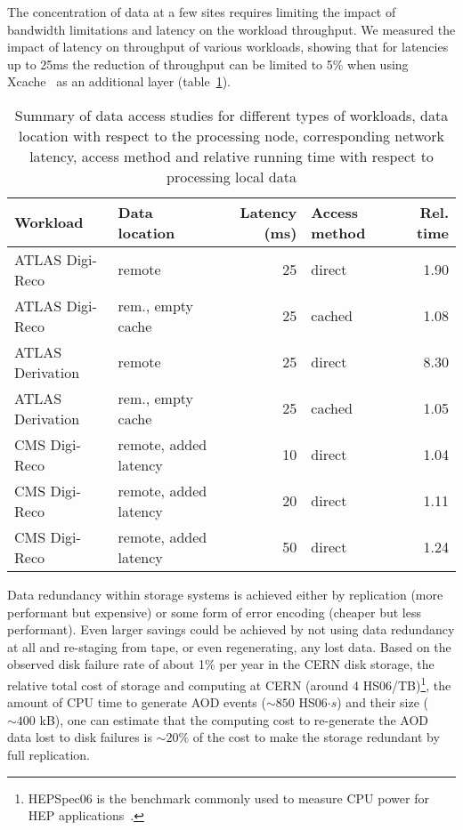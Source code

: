 The concentration of data at a few sites requires limiting the impact
of bandwidth limitations and latency on the workload throughput.  We
measured the impact of latency on throughput of various workloads,
showing that for latencies up to 25ms the reduction of throughput can
be limited to 5\% when using Xcache~\cite{xcache} as an additional layer
(table~\ref{tab:latency}).
\begin{table}
  \centering
  \caption{ Summary of data access studies for different types of
    workloads, data location with respect to the processing node,
    corresponding network latency, access method and relative running
    time with respect to processing local data}
  \label{tab:latency}
  \begin{tabular}{llrlr}
    \hline
    Workload & Data location & Latency (ms) & Access method & Rel. time \\\hline
    ATLAS Digi-Reco & remote & ~25 & direct & 1.90 \\ 
    ATLAS Digi-Reco & rem., empty cache & ~25 & cached & 1.08 \\ 
    ATLAS Derivation & remote & ~25 & direct & 8.30 \\ 
    ATLAS Derivation & rem., empty cache & ~25 & cached & 1.05 \\ 
    CMS Digi-Reco & remote, added latency& 10 & direct & 1.04 \\
    CMS Digi-Reco & remote, added latency& 20 & direct & 1.11 \\
    CMS Digi-Reco & remote, added latency& 50 & direct & 1.24 \\\hline
  \end{tabular}
\end{table}

Data redundancy within storage systems is achieved either by
replication (more performant but expensive) or some form of error
encoding (cheaper but less performant). Even larger savings could be
achieved by not using data redundancy at all and re-staging from tape,
or even regenerating, any lost data.  Based on the observed disk
failure rate of about 1\% per year in the CERN disk storage, the
relative total cost of storage and computing at CERN (around 4
HS06/TB)\footnote{HEPSpec06 is the benchmark commonly used to measure
  CPU power for HEP applications~\cite{hs06}.}, the amount of CPU time
to generate AOD events ($\sim 850$ HS06$\cdot s$) and their size
($\sim 400$ kB), one can estimate that the computing cost to
re-generate the AOD data lost to disk failures is $\sim 20\%$ of the
cost to make the storage redundant by full replication.

